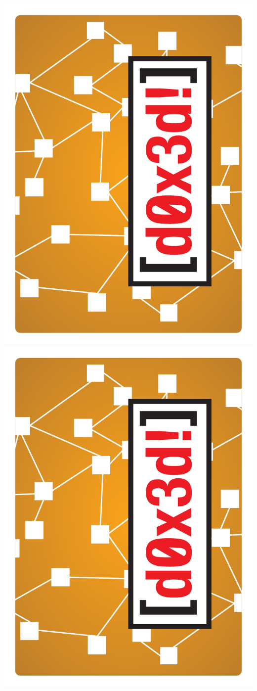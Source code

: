 \documentclass{letter}
\begin{document}
\includegraphics{backs/back_character}
\includegraphics{backs/back_character}
\end{document}
